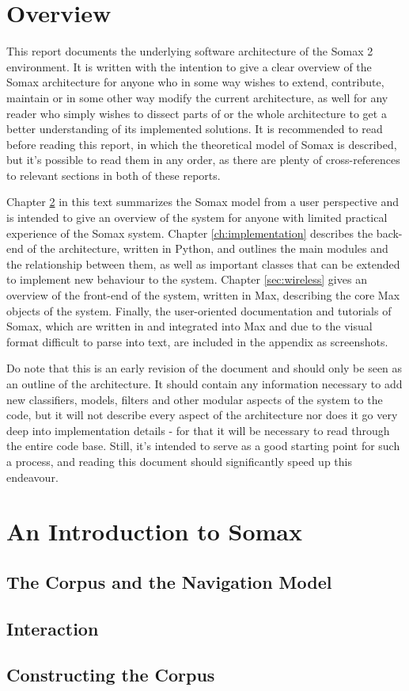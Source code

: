 \chapter{Overview}\label{sec:1-overview}
This report documents the underlying software architecture of the Somax 2 environment. It is written with the intention to give a clear overview of the Somax architecture for anyone who in some way wishes to extend, contribute, maintain or in some other way modify the current architecture, as well for any reader who simply wishes to dissect parts of or the whole architecture to get a better understanding of its implemented solutions. It is recommended to read \cite{somaxtheory2021} before reading this report, in which the theoretical model of Somax is described, but it's possible to read them in any order, as there are plenty of cross-references to relevant sections in both of these reports. 

Chapter \ref{sec:2-gentleintro} in this text summarizes the Somax model from a user perspective and is intended to give an overview of the system for anyone with limited practical experience of the Somax system. Chapter \ref{ch:implementation} describes the back-end of the architecture, written in Python, and outlines the main modules and the relationship between them, as well as important classes that can be extended to implement new behaviour to the system. Chapter \ref{sec:wireless} gives an overview of the front-end of the system, written in Max, describing the core Max objects of the system. Finally, the user-oriented documentation and tutorials of Somax, which are written in and integrated into Max and due to the visual format difficult to parse into text, are included in the appendix as screenshots.

Do note that this is an early revision of the document and should only be seen as an outline of the architecture. It should contain any information necessary to add new classifiers, models, filters and other modular aspects of the system to the code, but it will not describe every aspect of the architecture nor does it go very deep into implementation details - for that it will be necessary to read through the entire code base. Still, it's intended to serve as a good starting point for such a process, and reading this document should  significantly speed up this endeavour.
\begingroup
	\graphicspath{{../SomaxOverview/}}
	\chapter{An Introduction to Somax}\label{sec:2-gentleintro}
	
	\section{The Corpus and the Navigation Model}\label{ssec:1-corpusnavigationmodel}
	
	\section{Interaction}
	
	\section{Constructing the Corpus}
	
\endgroup
